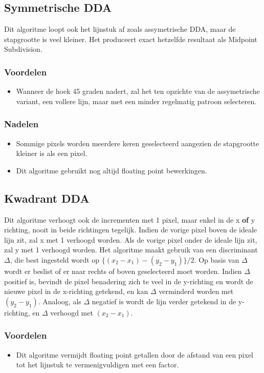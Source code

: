 \documentclass{report}
\begin{document}
	\subsection{Symmetrische DDA}
	Dit algoritme loopt ook het lijnstuk af zoals assymetrische DDA, maar de stapgrootte is veel kleiner. Het produceert exact hetzelfde resultaat als Midpoint Subdivision.
	\subsubsection{Voordelen}
	\begin{itemize}
		\item Wanneer de hoek 45 graden nadert, zal het ten opzichte van de assymetrische variant, een vollere lijn, maar met een minder regelmatig patroon selecteren.
	\end{itemize}
	\subsubsection{Nadelen}
	\begin{itemize}
		\item Sommige pixels worden meerdere keren geselecteerd aangezien de stapgrootte kleiner is als een pixel.
		\item Dit algoritme gebruikt nog altijd floating point bewerkingen.
	\end{itemize}

	\subsection{Kwadrant DDA}
	Dit algoritme verhoogt ook de incrementen met 1 pixel, maar enkel in de x \textbf{of} y richting, nooit in beide richtingen tegelijk. Indien de vorige pixel boven de ideale lijn zit, zal x met 1 verhoogd worden. Als de vorige pixel onder de ideale lijn zit, zal y met 1 verhoogd worden. Het algoritme maakt gebruik van een discriminant $\Delta$, die best ingesteld wordt op $\{(x_2 - x_1) - (y_2 - y_1)\}/2$. Op basis van $\Delta$ wordt er beslist of er naar rechts of boven geselecteerd moet worden. Indien $\Delta$ positief is, bevindt de pixel benadering zich te veel in de y-richting en wordt de nieuwe pixel in de x-richting getekend, en kan $\Delta$ verminderd worden met $(y_2 - y_1)$. Analoog, als $\Delta$ negatief is wordt de lijn verder getekend in de y-richting, en $\Delta$ verhoogd met $(x_2 - x_1)$.
	\subsubsection{Voordelen}
	\begin{itemize}
		\item Dit algoritme vermijdt floating point getallen door de afstand van een pixel tot het lijnstuk te vermenigvuldigen met een factor. 
	\end{itemize}
\end{document}

